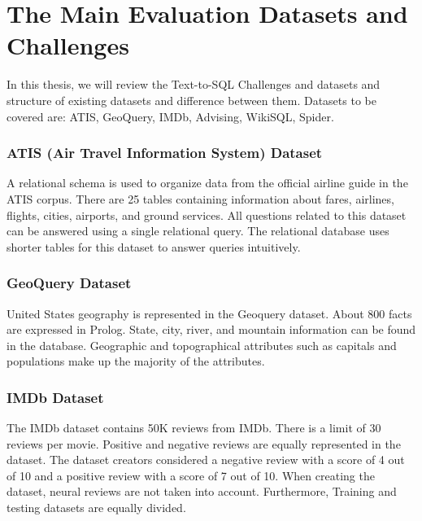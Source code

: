 \section{The Main Evaluation Datasets and Challenges}

In this thesis, we will review the Text-to-SQL Challenges and datasets and structure of existing datasets and difference between them. Datasets to be covered are: ATIS, GeoQuery, IMDb, Advising, WikiSQL, Spider.

\subsubsection{ATIS (Air Travel Information System) Dataset}

A relational schema is used to organize data from the official airline guide in the ATIS corpus. There are 25 tables containing information about fares, airlines, flights, cities, airports, and ground services. All questions related to this dataset can be answered using a single relational query. The relational database uses shorter tables for this dataset to answer queries intuitively.


\subsubsection{GeoQuery Dataset}

United States geography is represented in the Geoquery dataset. About 800 facts are expressed in Prolog. State, city, river, and mountain information can be found in the database. Geographic and topographical attributes such as capitals and populations make up the majority of the attributes.

\subsubsection{IMDb Dataset}

The IMDb dataset contains 50K reviews from IMDb. There is a limit of 30 reviews per movie\cite{maas-EtAl:2011:ACL-HLT2011}. Positive and negative reviews are equally represented in the dataset. The dataset creators considered a negative review with a score of 4 out of 10 and a positive review with a score of 7 out of 10. When creating the dataset, neural reviews are not taken into account. Furthermore, Training and testing datasets are equally divided.

